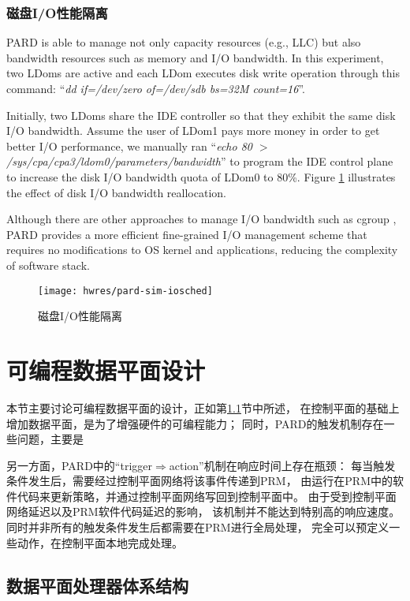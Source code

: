 \subsubsection{磁盘I/O性能隔离}

PARD is able to manage not only capacity resources (e.g., LLC)
but also bandwidth resources such as memory and I/O bandwidth.
In this experiment, two LDoms are active and each LDom executes
disk write operation through
this command: ``\emph{dd if=/dev/zero of=/dev/sdb bs=32M count=16}''.

Initially, two LDoms share the IDE controller so that they exhibit the same
disk I/O bandwidth. Assume the user of LDom1 pays more money in order to get
better I/O performance, we manually ran
``\emph{echo 80 $>$ /sys/cpa/cpa3/ldom0/parameters/bandwidth}''
to program the IDE control plane
to increase the disk I/O bandwidth quota of LDom0 to 80\%.
Figure \ref{fig:pardsim:iosched} illustrates the effect of disk I/O
bandwidth reallocation.

Although there are other approaches to manage I/O bandwidth such as cgroup \cite{cgroup},
PARD provides a more efficient fine-grained I/O management scheme that requires
no modifications to OS kernel and applications, reducing the complexity of software
stack.

\begin{figure}[tb]
  \centering
  \texttt{[image: hwres/pard-sim-iosched]}
  \caption{磁盘I/O性能隔离}
  \label{fig:pardsim:iosched}
\end{figure}


\section{可编程数据平面设计}
\label{chap:hwresman:dp}

本节主要讨论可编程数据平面的设计，正如第\ref{}节中所述，
在控制平面的基础上增加数据平面，是为了增强硬件的可编程能力；
同时，PARD的触发机制存在一些问题，主要是

另一方面，PARD中的``trigger$\Rightarrow$action''机制在响应时间上存在瓶颈：
每当触发条件发生后，需要经过控制平面网络将该事件传递到PRM，
由运行在PRM中的软件代码来更新策略，并通过控制平面网络写回到控制平面中。
由于受到控制平面网络延迟以及PRM软件代码延迟的影响，
该机制并不能达到特别高的响应速度。
同时并非所有的触发条件发生后都需要在PRM进行全局处理，
完全可以预定义一些动作，在控制平面本地完成处理。

\subsection{数据平面处理器体系结构}


